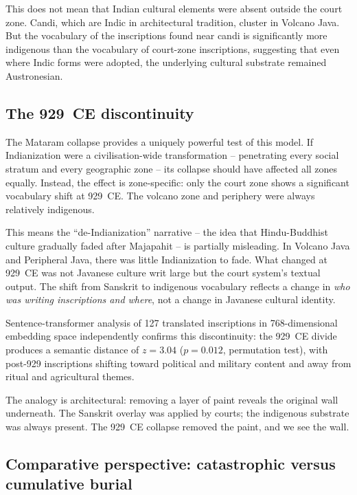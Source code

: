 \documentclass[12pt]{article}
\begin{document}
This does not mean that Indian cultural elements were absent outside the court zone.
Candi, which are Indic in architectural tradition, cluster in Volcano Java.
But the vocabulary of the inscriptions found near candi is significantly more indigenous than the vocabulary of court-zone inscriptions, suggesting that even where Indic forms were adopted, the underlying cultural substrate remained Austronesian.

\subsection{The 929~CE discontinuity}

The Mataram collapse provides a uniquely powerful test of this model.
If Indianization were a civilisation-wide transformation -- penetrating every social stratum and every geographic zone -- its collapse should have affected all zones equally.
Instead, the effect is zone-specific: only the court zone shows a significant vocabulary shift at 929~CE.
The volcano zone and periphery were always relatively indigenous.

This means the ``de-Indianization'' narrative -- the idea that Hindu-Buddhist culture gradually faded after Majapahit -- is partially misleading.
In Volcano Java and Peripheral Java, there was little Indianization to fade.
What changed at 929~CE was not Javanese culture writ large but the court system's textual output.
The shift from Sanskrit to indigenous vocabulary reflects a change in \emph{who was writing inscriptions and where}, not a change in Javanese cultural identity.

Sentence-transformer analysis of 127 translated inscriptions in 768-dimensional embedding space independently confirms this discontinuity: the 929~CE divide produces a semantic distance of $z = 3.04$ ($p = 0.012$, permutation test), with post-929 inscriptions shifting toward political and military content and away from ritual and agricultural themes.

The analogy is architectural: removing a layer of paint reveals the original wall underneath.
The Sanskrit overlay was applied by courts; the indigenous substrate was always present.
The 929~CE collapse removed the paint, and we see the wall.

\subsection{Comparative perspective: catastrophic versus cumulative burial}
\end{document}

